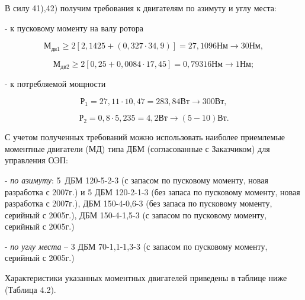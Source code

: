 В силу 41),42) получим требования к двигателям по азимуту и углу места:\par

- к пусковому моменту на валу ротора\par

\[ М_{дв1} \geq 2 \left[ 2,1425+ \left( 0,327⋅34,9 \right)  \right] =27,1096Нм \rightarrow 30Нм, \] \par

\[ М_{дв2} \geq 2 \left[ 0,25+0,0084⋅17,45 \right] =0,79316Нм \rightarrow 1Нм; \] \par

- к потребляемой мощности\par

\[ Р_{1}=27,11⋅10,47=283,84Вт \rightarrow 300Вт, \] \par

\[ Р_{2}=0,8⋅5,235=4,2Вт \rightarrow  \left( 5-10 \right) Вт. \] \par

С учетом полученных требований можно использовать наиболее приемлемые моментные двигатели (МД) типа ДБМ (согласованные с Заказчиком) для управления ОЭП:\par

- \textit{по азимуту}: 5\ ДБМ 120-5-2-3 (с запасом по пусковому моменту, новая разработка с 2007г.)  и 5 ДБМ 120-2-1-3 (без запаса по пусковому моменту, новая разработка с 2007г.), ДБМ 150-4-0,6-3 (без запаса по пусковому моменту, серийный с 2005г.), ДБМ 150-4-1,5-3 (с запасом по пусковому моменту, серийный с 2005г.)\par

- \textit{по углу места} – 3 ДБМ 70-1,1-1,3-3 (с запасом по пусковому моменту, серийный с 2005г.)\par

Характеристики указанных моментных двигателей приведены в таблице ниже (Таблица 4.2). \par

